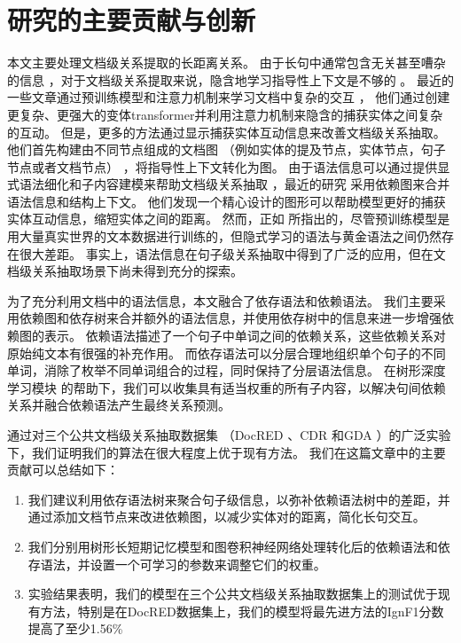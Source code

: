 \documentclass[bachelor]{thesis-uestc}
\begin{document}
\section{研究的主要贡献与创新}
本文主要处理文档级关系提取的长距离关系。
由于长句中通常包含无关甚至嘈杂的信息 \cite{gupta2019neural}，对于文档级关系提取来说，隐含地学习指导性上下文是不够的 \cite{bai-etal-2021-syntax}。
最近的一些文章通过预训练模型和注意力机制来学习文档中复杂的交互 \cite{huang-etal-2021-three, y2020-coreferential, zhou2021document}， 他们通过创建更复杂、更强大的变体transformer并利用注意力机制来隐含的捕获实体之间复杂的互动。
但是，更多的方法通过显示捕获实体互动信息来改善文档级关系抽取。他们首先构建由不同节点组成的文档图 （例如实体的提及节点，实体节点，句子节点或者文档节点） \cite{GAIN, liu2023document}，将指导性上下文转化为图。
由于语法信息可以通过提供显式语法细化和子内容建模来帮助文档级关系抽取 \cite{duan-etal-2022-just}，最近的研究 \cite{sahu2019inter, SagDRE} 采用依赖图来合并语法信息和结构上下文。
他们发现一个精心设计的图形可以帮助模型更好的捕获实体互动信息，缩短实体之间的距离。
然而，正如 \cite{sundararaman2019syntax, bai-etal-2021-syntax}所指出的，尽管预训练模型是用大量真实世界的文本数据进行训练的，但隐式学习的语法与黄金语法之间仍然存在很大差距。
事实上，语法信息在句子级关系抽取中得到了广泛的应用\cite{xu-etal-2016-improved, qin-etal-2021-relation}，但在文档级关系抽取场景下尚未得到充分的探索。\par

为了充分利用文档中的语法信息，本文融合了依存语法和依赖语法。
我们主要采用依赖图和依存树来合并额外的语法信息，并使用依存树中的信息来进一步增强依赖图的表示。
依赖语法描述了一个句子中单词之间的依赖关系，这些依赖关系对原始纯文本有很强的补充作用。
而依存语法可以分层合理地组织单个句子的不同单词，消除了枚举不同单词组合的过程，同时保持了分层语法信息。
在树形深度学习模块 \cite{duan-etal-2022-just} 的帮助下，我们可以收集具有适当权重的所有子内容，以解决句间依赖关系并融合依赖语法产生最终关系预测。\par


通过对三个公共文档级关系抽取数据集 （DocRED \cite{DOCRED}、CDR \cite{li2016biocreative} 和GDA \cite{GDA} ）的广泛实验下，我们证明我们的算法在很大程度上优于现有方法。
我们在这篇文章中的主要贡献可以总结如下：
\begin{enumerate}
    \item 我们建议利用依存语法树来聚合句子级信息，以弥补依赖语法树中的差距，并通过添加文档节点来改进依赖图，以减少实体对的距离，简化长句交互。
    \item 我们分别用树形长短期记忆模型和图卷积神经网络处理转化后的依赖语法和依存语法，并设置一个可学习的参数来调整它们的权重。
    \item 实验结果表明，我们的模型在三个公共文档级关系抽取数据集上的测试优于现有方法，特别是在DocRED数据集上，我们的模型将最先进方法的IgnF1分数提高了至少1.56\%
\end{enumerate}
\end{document}
